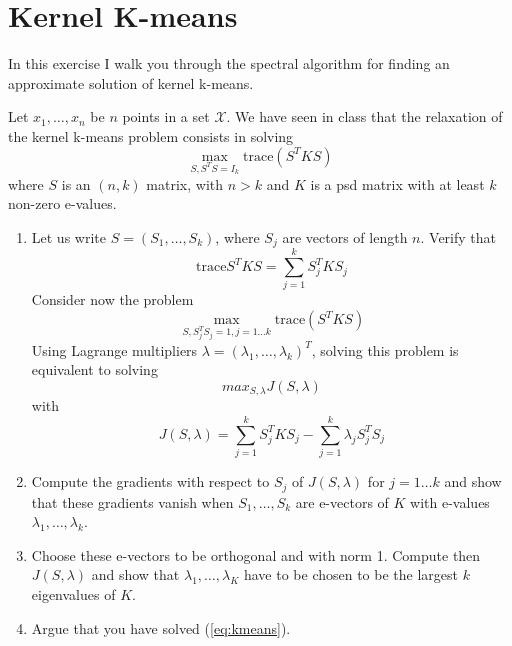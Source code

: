 \documentclass{article}[12pt]
\begin{document}
 \section{Kernel K-means}
 
 In this exercise I walk you through the spectral algorithm for finding an approximate solution of kernel k-means. 
 
 Let $x_1,\ldots,x_n$ be $n$ points in a set $\mathcal{X}$. We have seen in class that the relaxation of the kernel k-means problem consists in solving 
 \begin{equation}
 \label{eq:kmeans}
 \max_{S,S^TS=I_k} \mbox{trace}\left(S^TKS\right)
 \end{equation}
 where $S$ is an $(n,k)$ matrix, with $n>k$ and $K$ is a psd matrix with at least $k$ non-zero e-values. 
 \begin{enumerate}
 \item Let us write $S=(S_1,\ldots,S_k)$, where $S_j$ are vectors of length $n$. 
 Verify that 
 \begin{equation}
 \mbox{trace}S^TKS = \sum_{j=1}^k S_j^T K S_j
 \end{equation}
 Consider now the problem 
 \begin{equation}
 \label{eq:2}
 \max_{S,S_j^TS_j=1,j=1\ldots k} \mbox{trace}\left(S^TKS\right)
 \end{equation}
 Using Lagrange multipliers $\lambda=(\lambda_1,\ldots,\lambda_k)^T$, solving this problem is equivalent to solving 
 \begin{equation}
 max_{S,\lambda} J(S,\lambda) 
 \end{equation}
 with 
 \begin{equation}
 J(S,\lambda) =  \sum_{j=1}^k S_j^T K S_j - \sum_{j=1}^k \lambda_j S_j^TS_j
 \end{equation}
 \item Compute the gradients with respect to $S_j$ of $J(S,\lambda)$ for $j=1\ldots k$ and show that these gradients vanish when $S_1,\ldots,S_k$ are e-vectors of $K$ with e-values $\lambda_1,\ldots,\lambda_k$.  
 \item Choose these e-vectors to be orthogonal and with norm 1. Compute then $J(S,\lambda)$ and show that $\lambda_1,\ldots,\lambda_K$ have to be chosen to be the largest $k$ eigenvalues of $K$. 
 \item Argue that you have solved (\ref{eq:kmeans}). 
 

\end{enumerate}
\end{document}
